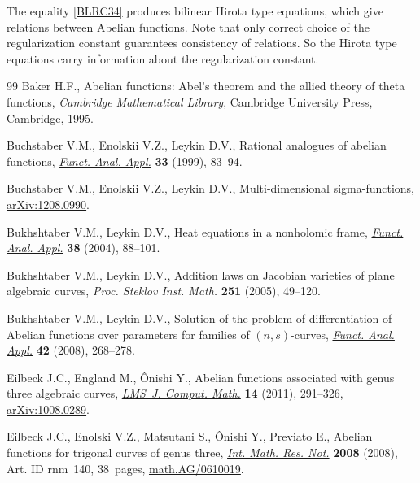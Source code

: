 \documentclass[11pt]{article}
\numberwithin{equation}{section}
\begin{document}
\begin{Remark}The equality \eqref{BLRC34} produces bilinear Hirota type equations, which give relations between Abelian functions. Note that
only correct choice of the regularization constant guarantees consistency of relations. So the Hirota type equations carry information about the regularization constant.
\end{Remark}
\begin{thebibliography}{99}
Baker H.F., Abelian functions: Abel's theorem and the allied theory of theta
 functions, \textit{Cambridge Mathematical Library}, Cambridge University Press,
 Cambridge, 1995.

Buchstaber V.M., Enolskii V.Z., Leykin D.V., Rational analogues of abelian
 functions, \href{https://doi.org/10.1007/BF02465189}{\textit{Funct. Anal. Appl.}} \textbf{33} (1999), 83--94.

Buchstaber V.M., Enolskii V.Z., Leykin D.V., Multi-dimensional sigma-functions,
 \href{https://arxiv.org/abs/1208.0990}{arXiv:1208.0990}.

Bukhshtaber V.M., Leykin D.V., Heat equations in a nonholomic frame,
 \href{https://doi.org/10.1023/B:FAIA.0000034039.92913.8a}{\textit{Funct. Anal. Appl.}} \textbf{38} (2004), 88--101.

Bukhshtaber V.M., Leykin D.V., Addition laws on {J}acobian varieties of plane
 algebraic curves, \textit{Proc. Steklov Inst. Math.} \textbf{251} (2005),
 49--120.

Bukhshtaber V.M., Leykin D.V., Solution of the problem of differentiation of
 Abelian functions over parameters for families of {$(n,s)$}-curves,
 \href{https://doi.org/10.1007/s10688-008-0040-4}{\textit{Funct. Anal. Appl.}} \textbf{42} (2008), 268--278.

Eilbeck J.C., England M., \^Onishi Y., Abelian functions associated with genus
 three algebraic curves, \href{https://doi.org/10.1112/S1461157010000355}{\textit{LMS~J. Comput. Math.}} \textbf{14} (2011),
 291--326, \href{https://arxiv.org/abs/1008.0289}{arXiv:1008.0289}.

Eilbeck J.C., Enolski V.Z., Matsutani S., \^Onishi Y., Previato E., Abelian
 functions for trigonal curves of genus three, \href{https://doi.org/10.1093/imrn/rnm140}{\textit{Int. Math. Res. Not.}}
 \textbf{2008} (2008), Art. ID rnm~140, 38~pages, \href{https://arxiv.org/abs/math.AG/0610019}{math.AG/0610019}.


\end{thebibliography}
\end{document}
